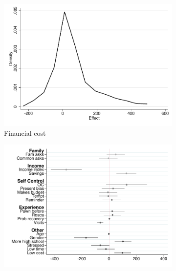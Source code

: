 \documentclass[11pt]{article}
\begin{document}
\begin{figure}[H]
    \caption{Heterogeneous Treatment Effect:  No-Choice/Promise}
    \label{heterogeneous_te_3}
    \begin{center}
    \begin{subfigure}{0.4\textwidth}
        \caption{Financial cost}
        \centering
        \includegraphics[width=\textwidth]{Figuras/he_dist_fc_admin_disc_pro_3.pdf}
    \end{subfigure}
    \begin{subfigure}{0.4\textwidth}
        \caption*{}
        \centering
        \includegraphics[width=\textwidth]{Figuras/HE/he_int_vertical_fc_admin_disc_pro_3.pdf}
    \end{subfigure}
    

\end{center}
\end{figure}
\end{document}
